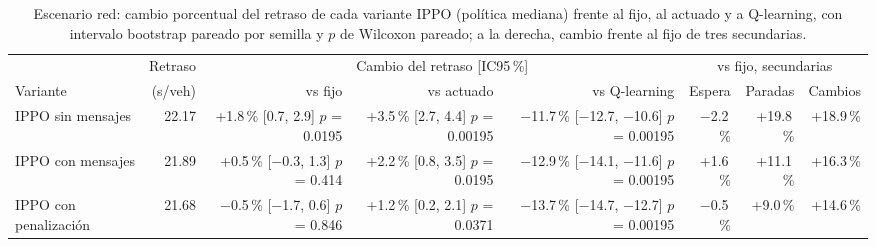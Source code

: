 \begin{table}[H]
\centering
\scriptsize
\setlength{\tabcolsep}{3pt}
\begin{tabular}{lrrrrrrr}
\toprule
 & Retraso & \multicolumn{3}{c}{Cambio del retraso [IC95\,\%]} & \multicolumn{3}{c}{vs fijo, secundarias} \\
\cmidrule(lr){3-5}\cmidrule(lr){6-8}
Variante & (s/veh) & vs fijo & vs actuado & vs Q-learning & Espera & Paradas & Cambios \\
\midrule
IPPO sin mensajes & 22.17 & \makecell[r]{+1.8\,\%\\{}[0.7, 2.9]\\$p$ = 0.0195} & \makecell[r]{+3.5\,\%\\{}[2.7, 4.4]\\$p$ = 0.00195} & \makecell[r]{$-$11.7\,\%\\{}[$-$12.7, $-$10.6]\\$p$ = 0.00195} & $-$2.2\,\% & +19.8\,\% & +18.9\,\% \\
IPPO con mensajes & 21.89 & \makecell[r]{+0.5\,\%\\{}[$-$0.3, 1.3]\\$p$ = 0.414} & \makecell[r]{+2.2\,\%\\{}[0.8, 3.5]\\$p$ = 0.0195} & \makecell[r]{$-$12.9\,\%\\{}[$-$14.1, $-$11.6]\\$p$ = 0.00195} & +1.6\,\% & +11.1\,\% & +16.3\,\% \\
IPPO con penalización & 21.68 & \makecell[r]{$-$0.5\,\%\\{}[$-$1.7, 0.6]\\$p$ = 0.846} & \makecell[r]{+1.2\,\%\\{}[0.2, 2.1]\\$p$ = 0.0371} & \makecell[r]{$-$13.7\,\%\\{}[$-$14.7, $-$12.7]\\$p$ = 0.00195} & $-$0.5\,\% & +9.0\,\% & +14.6\,\% \\
\bottomrule
\end{tabular}
\caption[Escenario red: cambio del retraso de las variantes IPPO]{Escenario red: cambio porcentual del retraso de cada variante IPPO (política mediana) frente al fijo, al actuado y a Q-learning, con intervalo bootstrap pareado por semilla y $p$ de Wilcoxon pareado; a la derecha, cambio frente al fijo de tres secundarias.}
\label{tab:red-u4-deltas}
\end{table}
